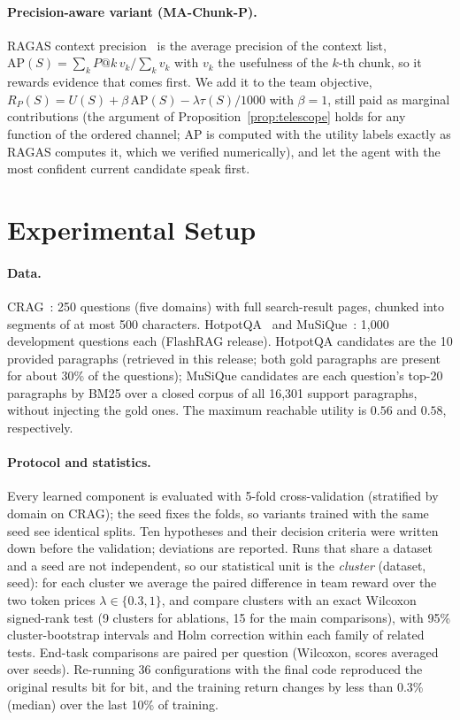 \documentclass[sigconf,anonymous]{aamas}
\theoremstyle{plain}
\theoremstyle{definition}
\begin{document}
\paragraph{Precision-aware variant (MA-Chunk-P).}
RAGAS context precision~\cite{es2024ragas} is the average precision of the context list, $\mathrm{AP}(S)=\sum_k P@k\,v_k/\sum_k v_k$ with $v_k$ the usefulness of the $k$-th chunk, so it rewards evidence that comes first. We add it to the team objective, $R_P(S)=U(S)+\beta\,\mathrm{AP}(S)-\lambda\tau(S)/1000$ with $\beta=1$, still paid as marginal contributions (the argument of Proposition~\ref{prop:telescope} holds for any function of the ordered channel; $\mathrm{AP}$ is computed with the utility labels exactly as RAGAS computes it, which we verified numerically), and let the agent with the most confident current candidate speak first.

\section{Experimental Setup}\label{sec:setup}

\paragraph{Data.}
CRAG~\cite{yang2024crag}: 250 questions (five domains) with full search-result pages, chunked into segments of at most 500 characters. HotpotQA~\cite{yang2018hotpotqa} and MuSiQue~\cite{trivedi2022musique}: 1{,}000 development questions each (FlashRAG release). HotpotQA candidates are the 10 provided paragraphs (retrieved in this release; both gold paragraphs are present for about 30\% of the questions); MuSiQue candidates are each question's top-20 paragraphs by BM25 over a closed corpus of all 16{,}301 support paragraphs, without injecting the gold ones. The maximum reachable utility is $0.56$ and $0.58$, respectively.

\paragraph{Protocol and statistics.}
Every learned component is evaluated with 5-fold cross-validation (stratified by domain on CRAG); the seed fixes the folds, so variants trained with the same seed see identical splits. Ten hypotheses and their decision criteria were written down before the validation; deviations are reported. Runs that share a dataset and a seed are not independent, so our statistical unit is the \emph{cluster} (dataset, seed): for each cluster we average the paired difference in team reward over the two token prices $\lambda\in\{0.3,1\}$, and compare clusters with an exact Wilcoxon signed-rank test (9 clusters for ablations, 15 for the main comparisons), with 95\% cluster-bootstrap intervals and Holm correction within each family of related tests. End-task comparisons are paired per question (Wilcoxon, scores averaged over seeds). Re-running 36 configurations with the final code reproduced the original results bit for bit, and the training return changes by less than 0.3\% (median) over the last 10\% of training.
\end{document}

